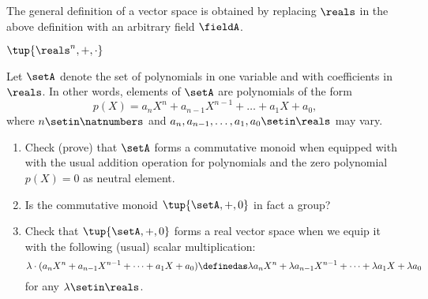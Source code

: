 \begin{remark}
    The general definition of a vector space is obtained by replacing $\reals$ in the above definition with an arbitrary field $\fieldA$.
\end{remark}

\begin{example}
    $\tup{\reals^n, +, \cdot}$
\end{example}



\begin{gradedexercise}
    \label{ex:real-polynomials}
    Let $\setA$ denote the set of polynomials in one variable and with coefficients in $\reals$.
    In other words, elements of $\setA$ are polynomials of the form
    \begin{equation}
        p(X) = a_nX^n + a_{n-1}
        X^{n-1} + \dots + a_1X + a_0,
    \end{equation}
    where $n \setin \natnumbers$ and $a_n, a_{n-1}, \dots, a_1, a_0 \setin \reals$ may vary.

    \begin{enumerate}
        \item Check (prove) that $\setA$ forms a commutative monoid when equipped with with the usual addition operation for polynomials and the zero polynomial $p(X) = 0$ as neutral element.
        \item Is the commutative monoid $\tup{\setA, +, 0}$ in fact a group?
        \item Check that $\tup{\setA, +, 0}$ forms a real vector space when we equip it with the following (usual) scalar multiplication:
              \begin{equation}
                  \lambda \cdot (a_nX^n + a_{n-1}
                  X^{n-1} + \dots + a_1X + a_0) \definedas \lambda a_nX^n + \lambda a_{n-1}X^{n-1} + \dots + \lambda a_1X + \lambda a_0
              \end{equation}
              for any $\lambda \setin \reals$.
    \end{enumerate}
\end{gradedexercise}


